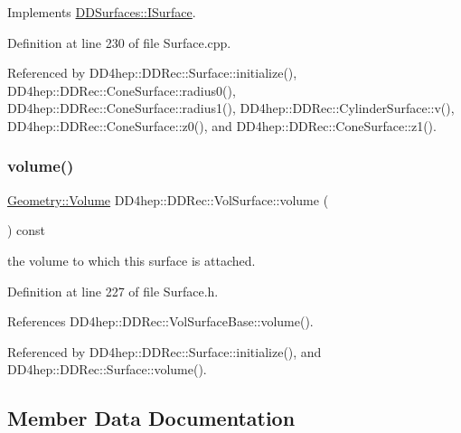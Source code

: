 Implements \hyperlink{class_d_d_surfaces_1_1_i_surface_a61c9f2057ea0383b39ead13a147b2838}{D\+D\+Surfaces\+::\+I\+Surface}.



Definition at line 230 of file Surface.\+cpp.



Referenced by D\+D4hep\+::\+D\+D\+Rec\+::\+Surface\+::initialize(), D\+D4hep\+::\+D\+D\+Rec\+::\+Cone\+Surface\+::radius0(), D\+D4hep\+::\+D\+D\+Rec\+::\+Cone\+Surface\+::radius1(), D\+D4hep\+::\+D\+D\+Rec\+::\+Cylinder\+Surface\+::v(), D\+D4hep\+::\+D\+D\+Rec\+::\+Cone\+Surface\+::z0(), and D\+D4hep\+::\+D\+D\+Rec\+::\+Cone\+Surface\+::z1().

\hypertarget{class_d_d4hep_1_1_d_d_rec_1_1_vol_surface_adb270690e78edba67ae7da449ccfd7fd}{}\label{class_d_d4hep_1_1_d_d_rec_1_1_vol_surface_adb270690e78edba67ae7da449ccfd7fd} 
\subsubsection{\texorpdfstring{volume()}{volume()}}
{\footnotesize\ttfamily \hyperlink{class_d_d4hep_1_1_geometry_1_1_volume}{Geometry\+::\+Volume} D\+D4hep\+::\+D\+D\+Rec\+::\+Vol\+Surface\+::volume (\begin{DoxyParamCaption}{ }\end{DoxyParamCaption}) const\hspace{0.3cm}{\ttfamily [inline]}}



the volume to which this surface is attached. 



Definition at line 227 of file Surface.\+h.



References D\+D4hep\+::\+D\+D\+Rec\+::\+Vol\+Surface\+Base\+::volume().



Referenced by D\+D4hep\+::\+D\+D\+Rec\+::\+Surface\+::initialize(), and D\+D4hep\+::\+D\+D\+Rec\+::\+Surface\+::volume().



\subsection{Member Data Documentation}
\hypertarget{class_d_d4hep_1_1_d_d_rec_1_1_vol_surface_a434add1326a87d6d6e5ee0209777cd45}{}\label{class_d_d4hep_1_1_d_d_rec_1_1_vol_surface_a434add1326a87d6d6e5ee0209777cd45} 
